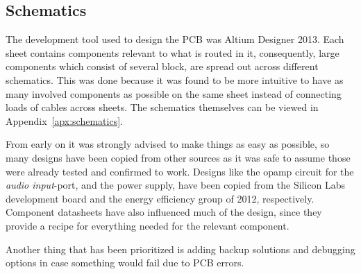 
\subsection{Schematics}

The development tool used to design the PCB was Altium Designer 2013. Each sheet
contains components relevant to what is routed in it, consequently, large
components which consist of several block, are spread out across different
schematics. This was done because it was found to be more  intuitive to have as
many involved components as possible on the same sheet instead of connecting
loads of cables across sheets. The schematics themselves can be viewed in
Appendix~\ref{apx:schematics}.

From early on it was strongly advised to make things as easy as possible, so
many designs have been copied from other sources as it was safe to assume those
were already tested and confirmed to work. Designs like the opamp circuit for
the \emph{audio input}-port, and the power supply, have been copied from the
Silicon Labs development board and the energy efficiency group of 2012,
respectively. Component datasheets have also influenced much of the design,
since they provide a recipe for everything needed for the relevant component.

Another thing that has been prioritized is adding backup solutions and debugging
options in case something would fail due to PCB errors. 


